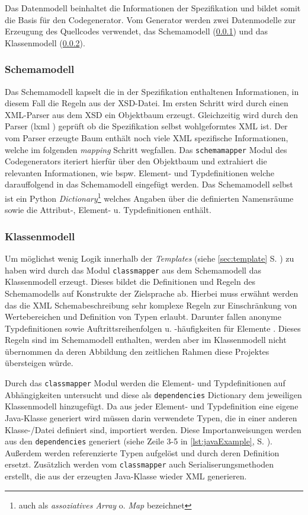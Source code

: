 Das Datenmodell beinhaltet die Informationen der Spezifikation und bildet somit die Basis für den Codegenerator.
Vom Generator werden zwei Datenmodelle zur Erzeugung des Quellcodes verwendet, das Schemamodell (\cref{sec:schemamodel}) und das Klassenmodell (\cref{sec:classmodel}).

\subsubsection{Schemamodell}
\label{sec:schemamodel}

Das Schemamodell kapselt die in der Spezifikation enthaltenen Informationen, in diesem Fall die Regeln aus der \gls{XSD}-Datei. Im ersten Schritt wird durch einen XML-Parser aus dem \gls{XSD} ein Objektbaum erzeugt. Gleichzeitig wird durch den Parser (lxml \cite{lxml}) geprüft ob die Spezifikation selbst wohlgeformtes \gls{XML} ist.
Der vom Parser erzeugte Baum enthält noch viele \gls{XML} spezifische Informationen, welche im folgenden \emph{mapping} Schritt wegfallen. Das \texttt{schemamapper} Modul des Codegenerators iteriert hierfür über den Objektbaum und extrahiert die relevanten Informationen, wie bspw. Element- und Typdefinitionen welche darauffolgend in das Schemamodell eingefügt werden. Das Schemamodell selbst ist ein Python \emph{Dictionary}\footnote{auch als \emph{assoziatives Array} o. \emph{Map} bezeichnet} welches Angaben über die definierten Namensräume sowie die Attribut-, Element- u. Typdefinitionen enthält.

\subsubsection{Klassenmodell}
\label{sec:classmodel}

Um möglichst wenig Logik innerhalb der \emph{Templates} (siehe \cref{sec:template} S. \pageref{sec:template}) zu haben wird durch das Modul \texttt{classmapper} aus dem Schemamodell das Klassenmodell erzeugt. Dieses bildet die Definitionen und Regeln des Schemamodells auf Konstrukte der Zielsprache ab. Hierbei muss erwähnt werden das die XML Schemabeschreibung sehr komplexe Regeln zur Einschränkung von Wertebereichen und Definition von Typen erlaubt. Darunter fallen anonyme Typdefinitionen sowie Auftrittsreihenfolgen u. -häufigkeiten für Elemente \cite{XMLschema}. Dieses Regeln sind im Schemamodell enthalten, werden aber im Klassenmodell nicht übernommen da deren Abbildung den zeitlichen Rahmen diese Projektes übersteigen würde.

Durch das \texttt{classmapper} Modul werden die Element- und Typdefinitionen auf Abhängigkeiten untersucht und diese als \texttt{dependencies} Dictionary dem jeweiligen Klassenmodell hinzugefügt. Da aus jeder Element- und Typdefinition eine eigene Java-Klasse generiert wird müssen darin verwendete Typen, die in einer anderen Klasse-/Datei definiert sind, importiert werden. Diese Importanweisungen werden aus den \texttt{dependencies} generiert (siehe Zeile 3-5 in \cref{lst:javaExample}, S. \pageref{lst:javaExample}).
Außerdem werden referenzierte Typen aufgelöst und durch deren Definition ersetzt. Zusätzlich werden vom \texttt{classmapper} auch Serialiserungsmethoden erstellt, die aus der erzeugten Java-Klasse wieder \gls{XML} generieren.

